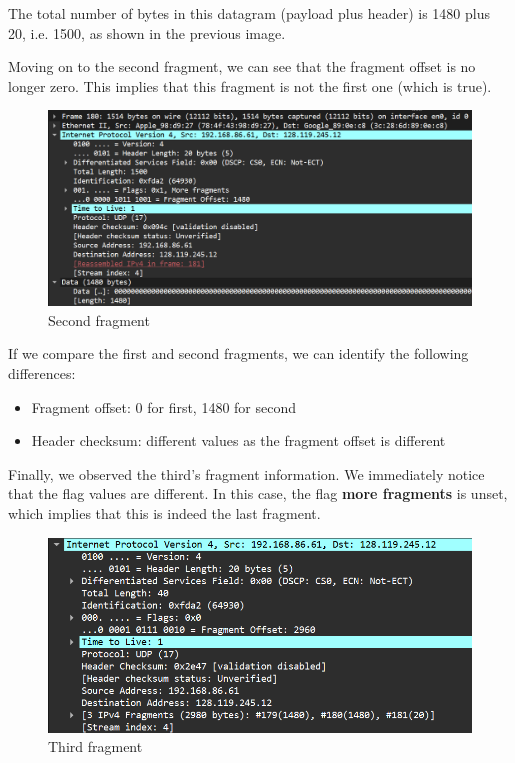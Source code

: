The total number of bytes in this datagram (payload plus header) is 1480 plus
20, i.e. 1500, as shown in the previous image.

Moving on to the second fragment, we can see that the fragment offset is no
longer zero. This implies that this fragment is not the first one (which is
true).

\begin{figure}[htbp]
    \centering
    \includegraphics[width=1\linewidth]{img/1/3_2.png}
    \caption{Second fragment}\label{fig:exp1_3_2}
\end{figure}

If we compare the first and second fragments, we can identify the following
differences:

\begin{itemize}
    \item Fragment offset: 0 for first, 1480 for second
    \item Header checksum: different values as the fragment offset is different
\end{itemize}

Finally, we observed the third's fragment information. We immediately notice
that the flag values are different. In this case, the flag \textbf{more
    fragments} is unset, which implies that this is indeed the last fragment.

\begin{figure}[htbp]
    \centering
    \includegraphics[width=1\linewidth]{img/1/3_3.png}
    \caption{Third fragment}\label{fig:exp1_3_3}
\end{figure}